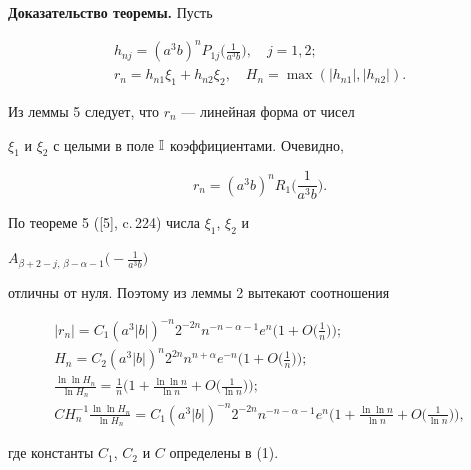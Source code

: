  


{\bf Доказательство теоремы.} Пусть 


\begin{gather*} 


h_{nj}=(a^3b)^n P_{1j}\bigg(\frac{1}{a^3b} \bigg),\quad j=1,2;\\ 


r_n=h_{n1}\xi_1+h_{n2}\xi_2,\quad 


H_n=\max(|h_{n1}|,|h_{n2}|). 


\end{gather*} 


Из леммы 5 следует, что $r_n$ --- линейная форма от чисел 


$\xi_1$ и $\xi_2$ с целыми в поле $\Bbb I$ коэффициентами. Очевидно, 


$$ 


r_n=(a^3b)^n R_1\bigg(\frac{1}{a^3b} \bigg). 


$$ 


По теореме 5 ([5], c.\,224) числа $\xi_1$, $\xi_2$ и 


$A_{\beta+2-j,\,\beta-\alpha-1}\big(-\frac{1}{a^3b}\big)$ 


отличны от нуля. Поэтому из леммы 2 вытекают соотношения 


\begin{gather} 


|r_n|=C_1(a^3|b|)^{-n}2^{-2n}n^{-n-\alpha-1}e^n 


\bigg(1+O\bigg(\frac{1}{n} \bigg)\bigg);\\ 


% 


H_n=C_2(a^3|b|)^n2^{2n}n^{n+\alpha}e^{-n} 


\bigg(1+O\bigg(\frac{1}{n} \bigg)\bigg); \\ 


% 


\frac{\ln\ln H_n}{\ln H_n}=\frac{1}{n}\bigg( 


1+\frac{\ln\ln n}{\ln n}+O\bigg(\frac{1}{\ln n} \bigg)\bigg);\\ 


% 


C H^{-1}_n\frac{\ln\ln H_n}{\ln H_n}=C_1(a^3|b|)^{-n} 


2^{-2n}n^{-n-\alpha-1}e^n\bigg(1+\frac{\ln\ln n}{\ln n} 


+O\bigg(\frac{1}{\ln n} \bigg)\bigg), 


\end{gather} 


где константы $C_1$, $C_2$ и $C$ определены в (1). 


